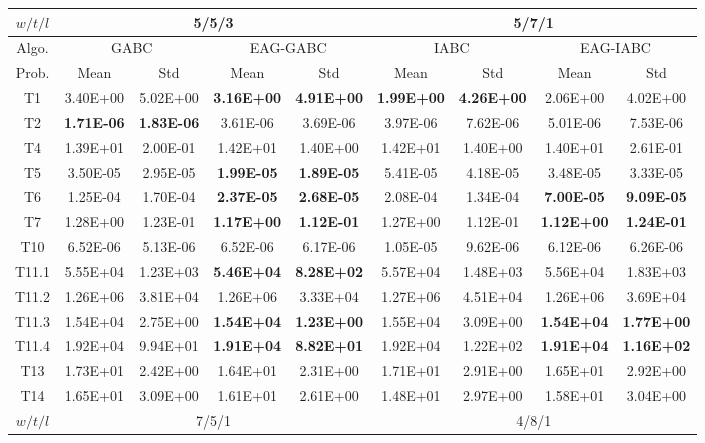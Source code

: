 \begin{table*}[!ht]
\begin{tabular}{|c|cc|cc|cc|cc|}
    \hline
    $w/t/l$ & \multicolumn{4}{c|}{5/5/3}     & \multicolumn{4}{c|}{5/7/1} \\
    \hline
    \hline
    Algo. & \multicolumn{2}{c|}{GABC} & \multicolumn{2}{c|}{EAG-GABC} & \multicolumn{2}{c|}{IABC} & \multicolumn{2}{c|}{EAG-IABC} \\
    \hline
    Prob. & Mean  & Std   & Mean  & Std   & Mean  & Std   & Mean  & Std \\
    \hline
    T1    & 3.40E+00 & 5.02E+00 & \textbf{3.16E+00} & \textbf{4.91E+00} & \textbf{1.99E+00} & \textbf{4.26E+00} & 2.06E+00 & 4.02E+00 \\
    T2    & \textbf{1.71E-06} & \textbf{1.83E-06} & 3.61E-06 & 3.69E-06 & 3.97E-06 & 7.62E-06 & 5.01E-06 & 7.53E-06 \\
    T4    & 1.39E+01 & 2.00E-01 & 1.42E+01 & 1.40E+00 & 1.42E+01 & 1.40E+00 & 1.40E+01 & 2.61E-01 \\
    T5    & 3.50E-05 & 2.95E-05 & \textbf{1.99E-05} & \textbf{1.89E-05} & 5.41E-05 & 4.18E-05 & 3.48E-05 & 3.33E-05 \\
    T6    & 1.25E-04 & 1.70E-04 & \textbf{2.37E-05} & \textbf{2.68E-05} & 2.08E-04 & 1.34E-04 & \textbf{7.00E-05} & \textbf{9.09E-05} \\
    T7    & 1.28E+00 & 1.23E-01 & \textbf{1.17E+00} & \textbf{1.12E-01} & 1.27E+00 & 1.12E-01 & \textbf{1.12E+00} & \textbf{1.24E-01} \\
    T10   & 6.52E-06 & 5.13E-06 & 6.52E-06 & 6.17E-06 & 1.05E-05 & 9.62E-06 & 6.12E-06 & 6.26E-06 \\
    T11.1 & 5.55E+04 & 1.23E+03 & \textbf{5.46E+04} & \textbf{8.28E+02} & 5.57E+04 & 1.48E+03 & 5.56E+04 & 1.83E+03 \\
    T11.2 & 1.26E+06 & 3.81E+04 & 1.26E+06 & 3.33E+04 & 1.27E+06 & 4.51E+04 & 1.26E+06 & 3.69E+04 \\
    T11.3 & 1.54E+04 & 2.75E+00 & \textbf{1.54E+04} & \textbf{1.23E+00} & 1.55E+04 & 3.09E+00 & \textbf{1.54E+04} & \textbf{1.77E+00} \\
    T11.4 & 1.92E+04 & 9.94E+01 & \textbf{1.91E+04} & \textbf{8.82E+01} & 1.92E+04 & 1.22E+02 & \textbf{1.91E+04} & \textbf{1.16E+02} \\
    T13   & 1.73E+01 & 2.42E+00 & 1.64E+01 & 2.31E+00 & 1.71E+01 & 2.91E+00 & 1.65E+01 & 2.92E+00 \\
    T14   & 1.65E+01 & 3.09E+00 & 1.61E+01 & 2.61E+00 & 1.48E+01 & 2.97E+00 & 1.58E+01 & 3.04E+00 \\
    \hline
    $w/t/l$ & \multicolumn{4}{c|}{7/5/1}     & \multicolumn{4}{c|}{4/8/1} \\

\end{tabular}
\end{table*}
